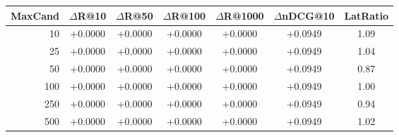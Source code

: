 \begin{tabular}{rcccccc}
\hline
MaxCand & $\Delta$R@10 & $\Delta$R@50 & $\Delta$R@100 & $\Delta$R@1000 & $\Delta$nDCG@10 & LatRatio \\
\hline
10 & +0.0000 & +0.0000 & +0.0000 & +0.0000 & +0.0949 & 1.09 \\
25 & +0.0000 & +0.0000 & +0.0000 & +0.0000 & +0.0949 & 1.04 \\
50 & +0.0000 & +0.0000 & +0.0000 & +0.0000 & +0.0949 & 0.87 \\
100 & +0.0000 & +0.0000 & +0.0000 & +0.0000 & +0.0949 & 1.00 \\
250 & +0.0000 & +0.0000 & +0.0000 & +0.0000 & +0.0949 & 0.94 \\
500 & +0.0000 & +0.0000 & +0.0000 & +0.0000 & +0.0949 & 1.02 \\
\hline
\end{tabular}